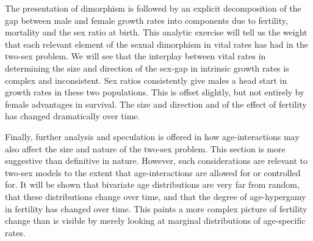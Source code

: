 The presentation of dimorphism is followed by an explicit decomposition of the
gap between male and female growth rates into components due to fertility,
mortality and the sex ratio at birth. This analytic exercise will tell us the
weight that each relevant element of the sexual dimorphism in vital rates has
had in the two-sex problem. We will see that the interplay between vital rates
in determining the size and direction of the sex-gap in intrinsic growth rates
is complex and inconsistent. Sex ratios consistently give males a head start in
growth rates in these two populations. This is offset slightly, but not entirely
by female advantages in survival. The size and direction and of the effect of
fertility has changed dramatically over time.

Finally, further analysis and speculation is offered in how age-interactions may
also affect the size and nature of the two-sex problem. This section is more
suggestive than definitive in nature. However, such considerations are relevant
to two-sex models to the extent that age-interactions are allowed for or
controlled for. It will be shown that bivariate age distributions are very far
from random, that these distributions change over time, and that the degree of
age-hypergamy in fertility has changed over time. This paints a more complex
picture of fertility change than is visible by merely looking at marginal
distributions of age-specific rates.









